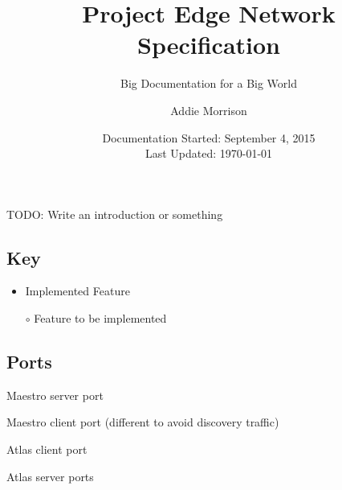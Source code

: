 \documentclass[10pt,a4paper]{scrreprt}
\author{Addie Morrison}
\title{Project Edge Network Specification}
\subtitle{Big Documentation for a Big World}
\date{Documentation Started: September 4, 2015\\ Last Updated: \today}
\begin{document}
	\maketitle
	TODO: Write an introduction or something
	\subsection{Key}
	\begin{itemize}[leftmargin=!,labelwidth=0.25\textwidth, itemsep=2ex]
		\item Implemented Feature
		\item[$\circ$] Feature to be implemented
	\end{itemize}
	\subsection{Ports}
	\begin{description}[leftmargin=!,labelwidth=0.25\textwidth, itemsep=2ex]
		\item[2345] Maestro server port
		\item[2346] Maestro client port (different to avoid discovery traffic)
		\item[2347] Atlas client port
		\item[2348-2500] Atlas server ports
	\end{description}
	\newpage
\end{document}
